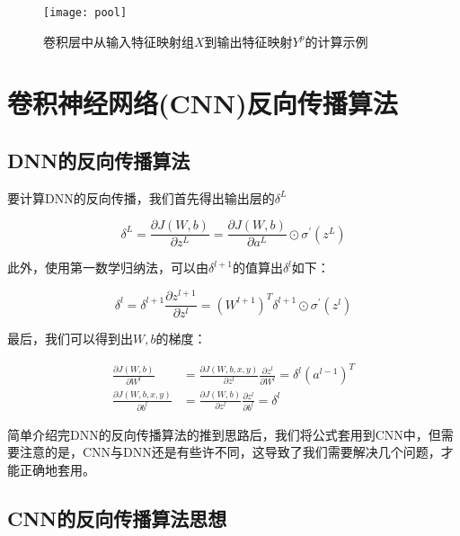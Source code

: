 \begin{figure}[h]
\centering
\texttt{[image: pool]}
\caption{卷积层中从输入特征映射组$X$到输出特征映射$Y^p$的计算示例}
\label{piture:7}
\end{figure}

\section{卷积神经网络(CNN)反向传播算法}

\subsection{DNN的反向传播算法}

要计算DNN的反向传播，我们首先得出输出层的$\delta^L$

\begin{equation}
\label{eq:3}
\delta^L = \frac{\partial J(W,b)}{\partial z^L} = \frac{\partial J(W,b)}{\partial a^L}\odot \sigma^{'}(z^L)
\end{equation}

此外，使用第一数学归纳法，可以由$\delta^{l+1}$的值算出$\delta^l$如下：

\begin{equation}
\label{eq:4}
\delta^{l} = \delta^{l+1}\frac{\partial z^{l+1}}{\partial z^{l}} = (W^{l+1})^T\delta^{l+1}\odot \sigma^{'}(z^l)
\end{equation}

最后，我们可以得到出$W,b$的梯度：

\begin{equation}
\label{eq:5}
\begin{aligned}
\frac{\partial J(W,b)}{\partial W^l} &= \frac{\partial J(W,b,x,y)}{\partial z^l} \frac{\partial z^l}{\partial W^l} = \delta^{l}(a^{l-1})^T\\
\frac{\partial J(W,b,x,y)}{\partial b^l} &= \frac{\partial J(W,b)}{\partial z^l} \frac{\partial z^l}{\partial b^l} = \delta^{l}
\end{aligned}
\end{equation}

简单介绍完DNN的反向传播算法的推到思路后，我们将公式套用到CNN中，但需要注意的是，CNN与DNN还是有些许不同，这导致了我们需要解决几个问题，才能正确地套用。

\subsection{CNN的反向传播算法思想}

